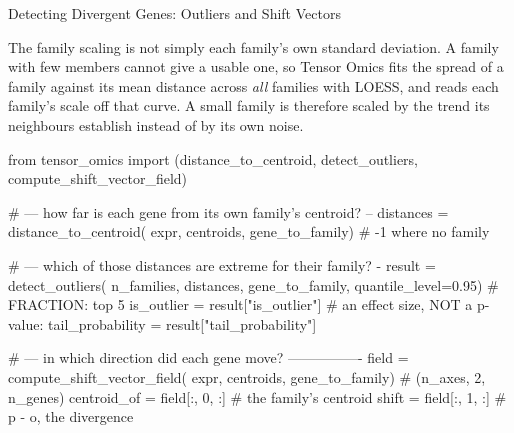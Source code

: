 \begin{recipe}[label=rec:outlier-detection]{Detecting Divergent Genes: Outliers and Shift Vectors}
\begin{note}
  The family scaling is not simply each family's own standard deviation. A
  family with few members cannot give a usable one, so Tensor Omics fits the
  spread of a family against its mean distance across \emph{all} families with
  LOESS, and reads each family's scale off that curve. A small family is
  therefore scaled by the trend its neighbours establish instead of by its own
  noise.
\end{note}


\begin{codefragment}[language=Python,caption={Fragments to edit: the threshold, and what you keep}]
from tensor_omics import (distance_to_centroid, detect_outliers,
                          compute_shift_vector_field)

# --- how far is each gene from its own family's centroid? --
distances = distance_to_centroid(
    expr, centroids, gene_to_family)   # -1 where no family

# --- which of those distances are extreme for their family? -
result = detect_outliers(
    n_families, distances, gene_to_family,
    quantile_level=0.95)               # FRACTION: top 5%
is_outlier = result["is_outlier"]
# an effect size, NOT a p-value:
tail_probability = result["tail_probability"]

# --- in which direction did each gene move? ----------------
field = compute_shift_vector_field(
    expr, centroids, gene_to_family)   # (n_axes, 2, n_genes)
centroid_of = field[:, 0, :]           # the family's centroid
shift       = field[:, 1, :]           # p - o, the divergence
\end{codefragment}

\begin{parameters}
\end{parameters}


\end{recipe}
